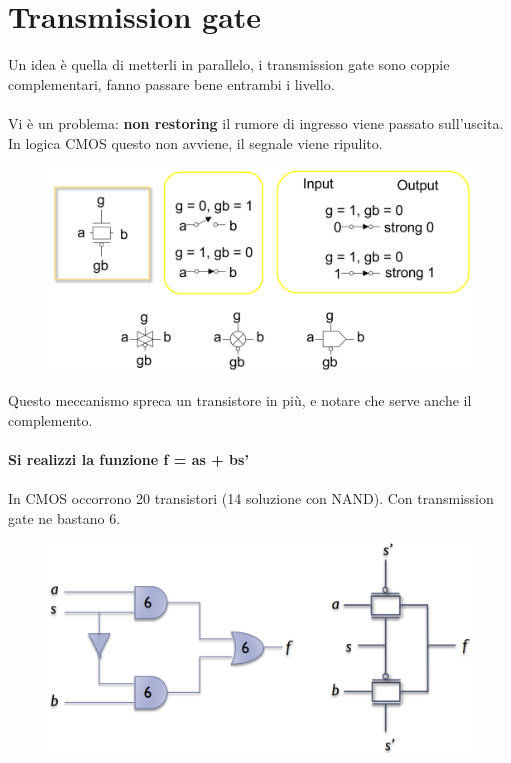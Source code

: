 \newpage
\section{Transmission gate}
Un idea è quella di metterli in parallelo, i transmission	gate	sono	coppie	complementari, fanno passare bene entrambi i livello.

\paragraph{}

Vi è un problema: \textbf{non restoring} il	rumore	di	ingresso	viene	passato	sull'uscita. In logica CMOS questo non avviene, il segnale viene ripulito.

\begin{figure}[htbp]
    \centering
    \includegraphics[width=0.6\linewidth]{img/trans_gatre.png}   
    
\end{figure}

Questo meccanismo spreca un transistore in più, e notare che serve anche il complemento.


\paragraph{Si	realizzi	la	funzione	f =	as +	bs'}

\paragraph{}
In	CMOS	occorrono	20	transistori	(14	soluzione	con	NAND). Con	transmission	gate	ne	bastano	6.

\begin{figure}[htbp]
    \centering
    \includegraphics[width=0.7\linewidth]{img/aksdcjvubc.png}        
\end{figure}

